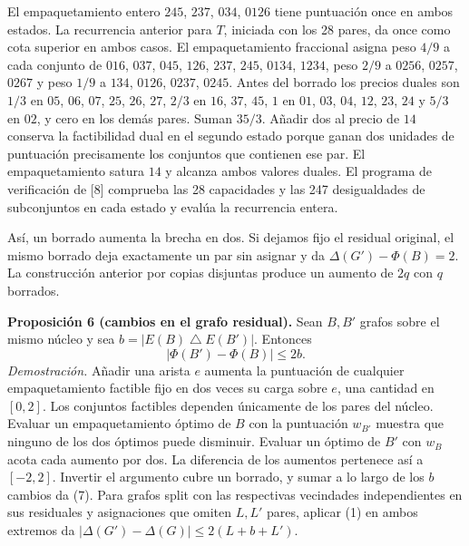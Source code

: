 \documentclass[spanish,11pt,a4paper]{article}
\begin{document}
El empaquetamiento entero \(245\), \(237\), \(034\), \(0126\) tiene puntuación once en ambos estados. La recurrencia anterior para \(T\), iniciada con los 28 pares, da once como cota superior en ambos casos. El empaquetamiento fraccional asigna peso \(4/9\) a cada conjunto de \(016\), \(037\), \(045\), \(126\), \(237\), \(245\), \(0134\), \(1234\), peso \(2/9\) a \(0256\), \(0257\), \(0267\) y peso \(1/9\) a \(134\), \(0126\), \(0237\), \(0245\). Antes del borrado los precios duales son \(1/3\) en \(05\), \(06\), \(07\), \(25\), \(26\), \(27\), \(2/3\) en \(16\), \(37\), \(45\), \(1\) en \(01\), \(03\), \(04\), \(12\), \(23\), \(24\) y \(5/3\) en \(02\), y cero en los demás pares. Suman \(35/3\). Añadir dos al precio de \(14\) conserva la factibilidad dual en el segundo estado porque ganan dos unidades de puntuación precisamente los conjuntos que contienen ese par. El empaquetamiento satura \(14\) y alcanza ambos valores duales. El programa de verificación de {[}8{]} comprueba las 28 capacidades y las 247 desigualdades de subconjuntos en cada estado y evalúa la recurrencia entera.

Así, un borrado aumenta la brecha en dos. Si dejamos fijo el residual original, el mismo borrado deja exactamente un par sin asignar y da \(\Delta(G')-\Phi(B)=2\). La construcción anterior por copias disjuntas produce un aumento de \(2q\) con \(q\) borrados.

\textbf{Proposición 6 (cambios en el grafo residual).} Sean \(B,B'\) grafos sobre el mismo núcleo y sea \(b=|E(B)\mathbin{\triangle} E(B')|\). Entonces \[
|\Phi(B')-\Phi(B)|\le 2b. \tag{7}
\] \emph{Demostración.} Añadir una arista \(e\) aumenta la puntuación de cualquier empaquetamiento factible fijo en dos veces su carga sobre \(e\), una cantidad en \([0,2]\). Los conjuntos factibles dependen únicamente de los pares del núcleo. Evaluar un empaquetamiento óptimo de \(B\) con la puntuación \(w_{B'}\) muestra que ninguno de los dos óptimos puede disminuir. Evaluar un óptimo de \(B'\) con \(w_B\) acota cada aumento por dos. La diferencia de los aumentos pertenece así a \([-2,2]\). Invertir el argumento cubre un borrado, y sumar a lo largo de los \(b\) cambios da (7). Para grafos split con las respectivas vecindades independientes en sus residuales y asignaciones que omiten \(L,L'\) pares, aplicar (1) en ambos extremos da \(|\Delta(G')-\Delta(G)|\le 2(L+b+L')\).
\end{document}
